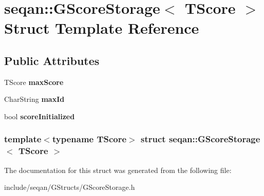 \hypertarget{structseqan_1_1_g_score_storage}{\section{seqan\-:\-:\-G\-Score\-Storage$<$ \-T\-Score $>$ \-Struct \-Template \-Reference}
\label{structseqan_1_1_g_score_storage}
}
\subsection*{\-Public \-Attributes}
\begin{DoxyCompactItemize}
\item 
\hypertarget{structseqan_1_1_g_score_storage_a6473cc22038cb7f21df5866a6c452883}{\-T\-Score {\bfseries max\-Score}}\label{structseqan_1_1_g_score_storage_a6473cc22038cb7f21df5866a6c452883}

\item 
\hypertarget{structseqan_1_1_g_score_storage_a264d4bc37f5c32b79a8fbbb5ffd24a4f}{\-Char\-String {\bfseries max\-Id}}\label{structseqan_1_1_g_score_storage_a264d4bc37f5c32b79a8fbbb5ffd24a4f}

\item 
\hypertarget{structseqan_1_1_g_score_storage_a57225443721c66d5a3e5290775dd350c}{bool {\bfseries score\-Initialized}}\label{structseqan_1_1_g_score_storage_a57225443721c66d5a3e5290775dd350c}

\end{DoxyCompactItemize}
\subsubsection*{template$<$typename \-T\-Score$>$ struct seqan\-::\-G\-Score\-Storage$<$ T\-Score $>$}



\-The documentation for this struct was generated from the following file\-:\begin{DoxyCompactItemize}
\item 
include/seqan/\-G\-Structs/\-G\-Score\-Storage.\-h\end{DoxyCompactItemize}
